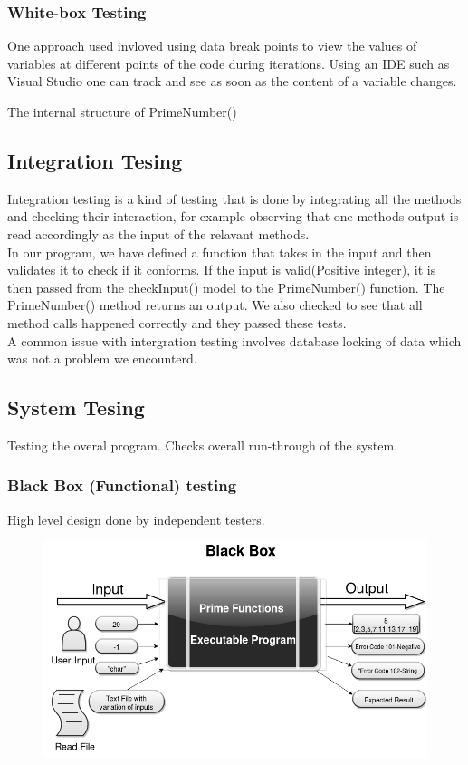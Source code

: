 \documentclass[11 pt]{article}
\begin{document}
\subsubsection{White-box Testing}
One approach used invloved using data break points to view the values of variables at different points of the code during iterations. Using an IDE such as Visual Studio one can track and see as soon as the content of a variable changes.

The internal structure of PrimeNumber()

\subsection{Integration Tesing}
Integration testing is a kind of testing that is done by integrating all the methods and checking their interaction, for example observing that one methods output is read accordingly as the input of the relavant methods.\\
In our program, we have defined a function that takes in the input and then validates it to check if it conforms. If the input is valid(Positive integer), it is then passed from the checkInput() model to the PrimeNumber() function. The PrimeNumber() method returns an output.
We also checked to see that all method calls happened correctly and they passed these tests.\\
A common issue with intergration testing involves database locking of data which was not a problem we encounterd.

\subsection{System Tesing}
Testing the overal program. Checks overall run-through of the system.
\subsubsection{Black Box (Functional) testing}
High level design done by independent testers.\\

    \begin{figure}[h]
    \centering
    
    \includegraphics[width=\linewidth]{Black Box Diagram.png}
    \end{figure}
 

 
\end{document}

